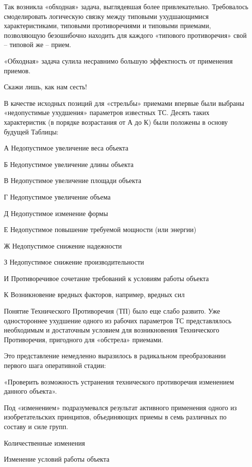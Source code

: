 \documentclass[11pt,a4paper]{article}
\begin{document}
Так возникла «обходная» задача, выглядевшая более привлекательно. Требовалось
смоделировать логическую связку между типовыми ухудшающимися характеристиками,
типовыми противоречиями и типовыми приемами, позволяющую безошибочно находить
для каждого «типового противоречия» свой -- типовой же -- прием.

«Обходная» задача сулила несравнимо большую эффектность от применения приемов.

Скажи лишь, как нам сесть!

В качестве исходных позиций для «стрельбы» приемами впервые были выбраны
«недопустимые ухудшения» параметров известных ТС. Десять таких характеристик
(в порядке возрастания от А до К) были положены в основу будущей Таблицы:

    А Недопустимое увеличение веса объекта

    Б Недопустимое увеличение длины объекта

    В Недопустимое увеличение площади объекта

    Г Недопустимое увеличение объема

    Д Недопустимое изменение формы

    Е Недопустимое повышение требуемой мощности (или энергии)

    Ж Недопустимое снижение надежности

    З Недопустимое снижение производительности

    И Противоречивое сочетание требований к условиям работы объекта

    К Возникновение вредных факторов, например, вредных сил

Понятие Технического Противоречия (ТП) было еще слабо развито. Уже
одностороннее ухудшение одного из рабочих параметров ТС представлялось
необходимым и достаточным условием для возникновения Технического
Противоречия, пригодного для «обстрела» приемами.

Это представление немедленно выразилось в радикальном преобразовании первого
шага оперативной стадии:

«Проверить возможность устранения технического противоречия изменением данного
объекта».

Под «изменением» подразумевался результат активного применения одного из
изобретательских принципов, объединяющих приемы в семь различных по составу и
силе групп.

    Количественные изменения

    Изменение условий работы объекта
\end{document}
